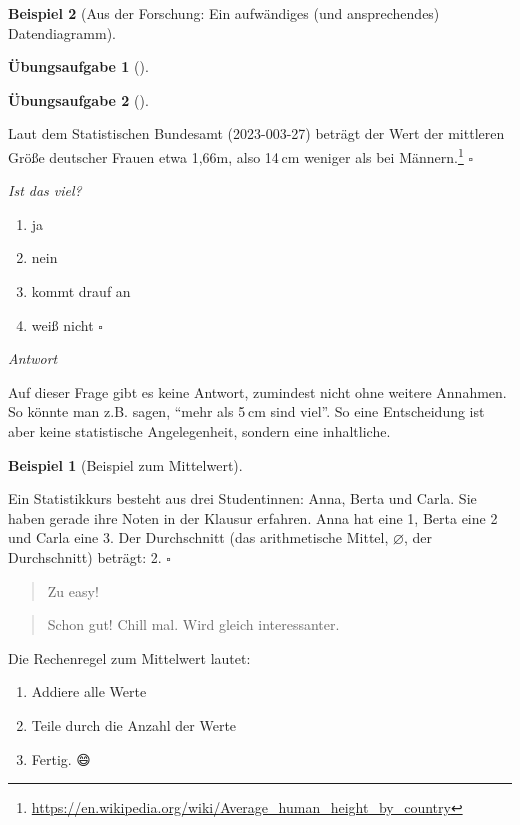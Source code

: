 \documentclass[
  a4paper,
]{scrbook}
\providecommand{\tightlist}{%
  \setlength{\itemsep}{0pt}\setlength{\parskip}{0pt}}\usepackage{longtable,booktabs,array}
\theoremstyle{definition}
\newtheorem{example}{Beispiel}[chapter]
\theoremstyle{definition}
\theoremstyle{definition}
\newtheorem{exercise}{Übungsaufgabe}[chapter]
\theoremstyle{remark}
\begin{document}
\begin{example}[Aus der Forschung: Ein aufwändiges (und ansprechendes)
Datendiagramm]
\begin{exercise}[]
\end{exercise}

\begin{exercise}[]\protect\hypertarget{exr-mw2}{}\label{exr-mw2}

Laut dem Statistischen Bundesamt (2023-003-27) beträgt der Wert der
mittleren Größe deutscher Frauen etwa 1,66m, also 14 cm weniger als bei
Männern.\footnote{\url{https://en.wikipedia.org/wiki/Average_human_height_by_country}}
\(\square\)

\emph{Ist das viel?}

\begin{enumerate}
\def\labelenumi{\alph{enumi})}
\tightlist
\item
  ja
\item
  nein
\item
  kommt drauf an
\item
  weiß nicht \(\square\)
\end{enumerate}

\emph{Antwort}

Auf dieser Frage gibt es keine Antwort, zumindest nicht ohne weitere
Annahmen. So könnte man z.B. sagen, ``mehr als 5 cm sind viel''. So eine
Entscheidung ist aber keine statistische Angelegenheit, sondern eine
inhaltliche.

\end{exercise}

\begin{example}[Beispiel zum
Mittelwert]\protect\hypertarget{exm-mw}{}\label{exm-mw}

Ein Statistikkurs besteht aus drei Studentinnen: Anna, Berta und Carla.
Sie haben gerade ihre Noten in der Klausur erfahren. Anna hat eine 1,
Berta eine 2 und Carla eine 3. Der Durchschnitt (das arithmetische
Mittel, \(\varnothing\), der Durchschnitt) beträgt: 2. \(\square\)

\end{example}

\begin{quote}
{} Zu easy!
\end{quote}

\begin{quote}
{} Schon gut! Chill mal. Wird gleich interessanter.
\end{quote}

Die Rechenregel zum Mittelwert lautet:

\begin{enumerate}
\def\labelenumi{\arabic{enumi}.}
\tightlist
\item
  Addiere alle Werte
\item
  Teile durch die Anzahl der Werte
\item
  Fertig. 😄
\end{enumerate}


\end{example}
\end{document}
